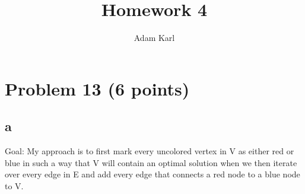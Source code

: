 \documentclass[a4paper]{article}
\title{Homework 4}
\author{Adam Karl}
\begin{document}
\maketitle


\section{Problem 13 (6 points)}
\subsection{a}

Goal: My approach is to first mark every uncolored vertex in V as either red or blue in such a way that V will contain an optimal solution when we then iterate over every edge in E and add every edge that connects a red node to a blue node to V. 
\end{document}
